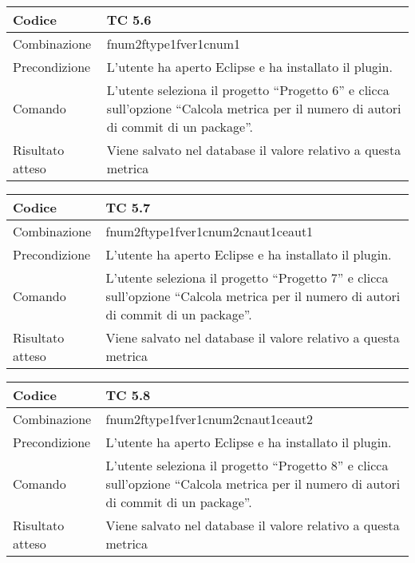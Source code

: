 \begin{table}[ht]
\begin{tabular}{|p{3cm}|p{9cm}|}
\hline
\cellcolor{lightgray}Codice				& TC 5.6								\\
\hline
\cellcolor{lightgray}Combinazione		& fnum2ftype1fver1cnum1								\\
\hline
\cellcolor{lightgray}Precondizione		& L'utente ha aperto Eclipse e ha installato il plugin.				\\
\hline
\cellcolor{lightgray}Comando			& L'utente seleziona il progetto ``Progetto 6''  e clicca sull'opzione ``Calcola metrica per il numero di autori di commit di un package''.	\\
\hline
\cellcolor{lightgray}Risultato atteso	& Viene salvato nel database il valore relativo a questa metrica	\\
\hline
\end{tabular}
\end{table}

\begin{table}[ht]
\begin{tabular}{|p{3cm}|p{9cm}|}
\hline
\cellcolor{lightgray}Codice				& TC 5.7								\\
\hline
\cellcolor{lightgray}Combinazione		& fnum2ftype1fver1cnum2cnaut1ceaut1							\\
\hline
\cellcolor{lightgray}Precondizione		& L'utente ha aperto Eclipse e ha installato il plugin.									\\
\hline
\cellcolor{lightgray}Comando			& L'utente seleziona il progetto ``Progetto 7''  e clicca sull'opzione ``Calcola metrica per il numero di autori di commit di un package''.	\\
\hline
\cellcolor{lightgray}Risultato atteso	& Viene salvato nel database il valore relativo a questa metrica	\\
\hline
\end{tabular}
\end{table}

\begin{table}[ht]
\begin{tabular}{|p{3cm}|p{9cm}|}
\hline
\cellcolor{lightgray}Codice				& TC 5.8								\\
\hline
\cellcolor{lightgray}Combinazione		& fnum2ftype1fver1cnum2cnaut1ceaut2 									\\
\hline
\cellcolor{lightgray}Precondizione		& L'utente ha aperto Eclipse e ha installato il plugin.				\\
\hline
\cellcolor{lightgray}Comando			& L'utente seleziona il progetto ``Progetto 8''  e clicca sull'opzione ``Calcola metrica per il numero di autori di commit di un package''.	\\
\hline
\cellcolor{lightgray}Risultato atteso	& Viene salvato nel database il valore relativo a questa metrica	\\
\hline
\end{tabular}
\end{table}

